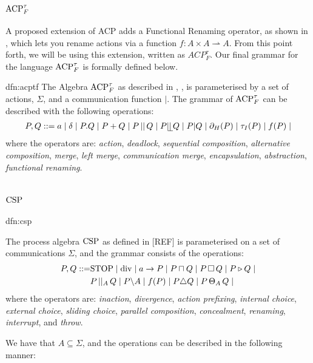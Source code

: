 \documentclass[../hons_project.tex]{subfiles}
\begin{document}
\subsection{\texorpdfstring{$\mathrm{ACP}_{F}^{\tau}$}{acptf}}
A proposed extension of ACP adds a Functional Renaming operator, as shown in \cite{vanglabbeekExpressivenessACP1995}, which lets you rename actions via a function $f : A \times A \rightharpoonup A$. From this point forth, we will be using this extension, written as $ACP^{\tau}_{F}$. Our final grammar for the language $\mathrm{ACP}_{F}^{\tau}$ is formally defined below.

\begin{dfn}{dfn:acptf}{}
   The Algebra $\mathrm{ACP}_{F}^{\tau}$ as described in \cite{bergstraACPtUniversalAxiom1989}, \cite{vanglabbeekExpressivenessACP1995}, is parameterised by a set of actions, $\Sigma$, and a communication function $|$. The grammar of $\mathrm{ACP}_{F}^{\tau}$ can be described with the following operations:
\begin{align*}
   P, Q ::= a \mid \delta \mid P . Q \mid P + Q \mid P \merge Q \mid P \leftmerge Q \mid P | Q \mid \restrict(P) \mid \abtau(P) \mid f(P) \mid
\end{align*}
where the operators are: \textit{action}, \textit{deadlock}, \textit{sequential composition}, \textit{alternative composition},  \textit{merge}, \textit{left merge}, \textit{communication merge}, \textit{encapsulation}, \textit{abstraction}, \textit{functional renaming}.
\end{dfn}


\section{\texorpdfstring{$\mathrm{CSP}$}{CSP}}\label{ssec:CSP}
\begin{dfn}{dfn:csp}{}

   The process algebra $\mathrm{CSP}$ as defined in [REF] is parameterised on a set of communications $\Sigma$, and the grammar consists of the operations:
   \begin{align*}
      P, Q ::= &\mathrm{STOP} \mid \mathrm{div} \mid a\to P \mid P \sqcap Q \mid P \,\square\, Q \mid P \triangleright Q \mid \\
	       &P \,\vert\vert_{A}\, Q \mid P \backslash A \mid f(P) \mid P \triangle Q \mid P \,\Theta_{A}\, Q \mid 
   \end{align*}
   where the operators are: \textit{inaction}, \textit{divergence}, \textit{action prefixing}, \textit{internal choice}, \textit{external choice}, \textit{sliding choice}, \textit{parallel composition}, \textit{concealment}, \textit{renaming}, \textit{interrupt}, and \textit{throw}.
\end{dfn}
We have that $A \subseteq \Sigma$, and the operations can be described in the following manner:
\end{document}
